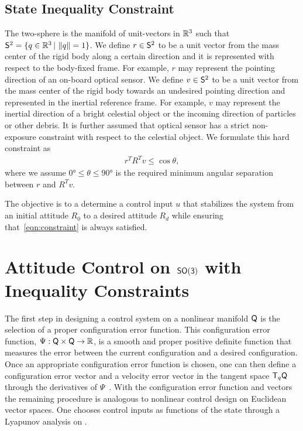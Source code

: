 \documentclass[letterpaper, 10 pt, conference]{ieeeconf}  %
\begin{document}
\subsection{State Inequality Constraint}

The two-sphere is the manifold of unit-vectors in \( \mathbb{R}^3 \) such that \( \mathsf{S}^2 = \{ q \in \mathbb{R}^3 \,  \vert \, \left\| q \right\| = 1 \}\).
We define \( r \in \mathsf{S}^2 \) to be a unit vector from the mass center of the rigid body along a certain direction and it is represented with respect to the body-fixed frame.
For example, \( r \) may represent the pointing direction of an on-board optical sensor.
We define \( v \in \mathsf{S}^2 \) to be a unit vector from the mass center of the rigid body towards an undesired pointing direction and represented in the inertial reference frame.
For example, \( v \) may represent the inertial direction of a bright celestial object or the incoming direction of particles or other debris.
It is further assumed that optical sensor has a strict non-exposure constraint with respect to the celestial object.
We formulate this hard constraint as
\begin{align}
	r^T R^T v \leq \cos \theta , \label{eqn:constraint}
\end{align}
where we assume \( \ang{0} \leq \theta \leq \ang{90}  \) is the required minimum angular separation between \( r \) and \( R^T v \). 

The objective is to a determine a control input \( u \) that stabilizes the system from an initial attitude \( R_0 \) to a desired attitude \( R_d \) while ensuring that~\cref{eqn:constraint} is always satisfied.

\section{Attitude Control on $\mathsf{SO(3)}$ with Inequality Constraints}

The first step in designing a control system on a nonlinear manifold \( \mathsf{Q} \) is the selection of a proper configuration error function. 
This configuration error function, \( \Psi : \mathsf{Q} \times \mathsf{Q} \to \mathbb{R} \), is a smooth and proper positive definite function that measures the error between the current configuration and a desired configuration. 
Once an appropriate configuration error function is chosen, one can then define a configuration error vector and a velocity error vector in the tangent space \( \mathsf{T}_q \mathsf{Q} \) through the derivatives of \( \Psi \)~\cite{bullo2004}. 
With the configuration error function and vectors the remaining procedure is analogous to nonlinear control design on Euclidean vector spaces. 
One chooses control inputs as functions of the state through a Lyapunov analysis on \Q.
\end{document}
